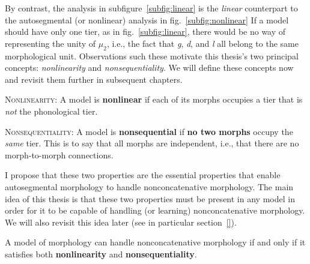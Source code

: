 By contrast, the analysis in subfigure~\ref{subfig:linear} is the \emph{linear} counterpart to the autosegmental  (or nonlinear) analysis in fig.~\ref{subfig:nonlinear}
If a model should have only one tier, as in 
fig.~\ref{subfig:linear}, there would be no way of representing the
unity of $\mu_2$, i.e., the fact that \textit{g}, \textit{d}, and \textit{l}
all belong to the same morphological unit. Observations such these motivate this thesis's two principal concepts: \emph{nonlinearity} and \emph{nonsequentiality}. We will define these concepts now and revisit them further in subsequent chapters. 

	\begin{definition}\label{def:nl}{\textsc{Nonlinearity}}: %
	A model is \textbf{nonlinear} if each of its morphs occupies a tier that is \emph{not} the phonological tier.
	\begin{definition}\label{def:ns}{\textsc{Nonsequentiality}}: %
	A model is \textbf{nonsequential} if \textbf{no two morphs} occupy the \emph{same} tier. This is to say that all morphs are independent, i.e., that there are no morph-to-morph connections.
	\end{definition}
I propose that these two properties are the essential properties that enable autosegmental morphology to handle nonconcatenative morphology. The main idea of this thesis is that these two properties must be present in any model in order for it to be capable of handling (or learning) nonconcatenative morphology.  We will also revisit this idea later (see in particular section~\ref{}).
\begin{proposition}\label{prop:nlns}
A model of morphology can handle nonconcatenative morphology if and only if it satisfies both \textbf{nonlinearity} and \textbf{nonsequentiality}. %
\end{proposition}

\end{definition}
